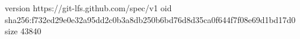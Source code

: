 version https://git-lfs.github.com/spec/v1
oid sha256:f732ed29e0e32a95dd2c0b3a8db250b6bd76d8d35ca0f644f7f08e69d1bd17d0
size 43840
